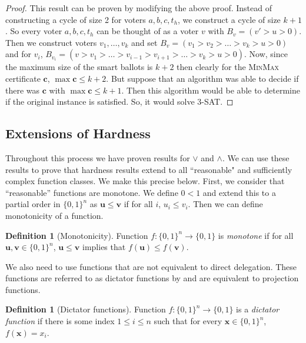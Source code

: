 \documentclass[11pt,a4paper, titlepage]{article}
\theoremstyle{definition}
\newtheorem{definition}[theorem]{Definition}
\let\vec\mathbf
\begin{document}
\begin{proof}
    This result can be proven by modifying the above proof. Instead of constructing a cycle of size 2 for voters $a, b, c, t_h$, we construct a cycle of size $k + 1$. So every voter $a, b, c, t_h$ can be thought of as a voter $v$ with $B_v = (v' > u > 0)$. Then we construct voters $v_1, \ldots, v_k$ and set $B_v = (v_1 > v_2 > \ldots > v_k > u > 0)$ and for $v_i$, $B_{v_i} = (v > v_1 > \ldots > v_{i - 1} > v_{i+1} > \ldots > v_k > u > 0)$.
    Now, since the maximum size of the smart ballots is $k + 2$ then clearly for the \textsc{MinMax} certificate $\vec{c}$, $\max{\vec{c}} \leq k + 2$. 
    But suppose that an algorithm was able to decide if there was $\vec{c}$ with $\max{\vec{c}} \leq k + 1$. Then this algorithm would be able to determine if the original instance is satisfied. So, it would solve \textsc{3-SAT}.
\end{proof}

\subsection{Extensions of Hardness}

Throughout this process we have proven results for $\lor$ and $\land$.
We can use these results to prove that hardness results extend to all ``reasonable" and sufficiently complex function classes.
We make this precise below.
First, we consider that ``reasonable'' functions are monotone. 
We define $0 < 1$ and extend this to a partial order in $\{0,1\}^n$ as $\vec{u} \leq \vec{v}$ if for all $i$, $u_i \leq v_i$.
Then we can define monotonicity of a function.

\begin{definition}[Monotonicity]
    \label{monotonicity}
    Function $f\colon \{0, 1\}^n \longrightarrow \{0, 1\}$ is \emph{monotone} if for all $\vec{u}, \vec{v} \in \{0,1\}^n$, $\vec{u} \leq \vec{v}$ implies that $f(\vec{u}) \leq f(\vec{v})$.
\end{definition}

We also need to use functions that are not equivalent to direct delegation. 
These functions are referred to as dictator functions by \cite{boolean} and are equivalent to projection functions.

\begin{definition}[Dictator functions]
    Function $f \colon \{0, 1\}^n \longrightarrow \{0, 1\}$ is a \emph{dictator function} if there is some index $1 \leq i \leq n$ such that for every $\vec{x} \in \{0, 1\}^n$, $f(\vec{x}) = x_i$.
\end{definition}
\end{document}
